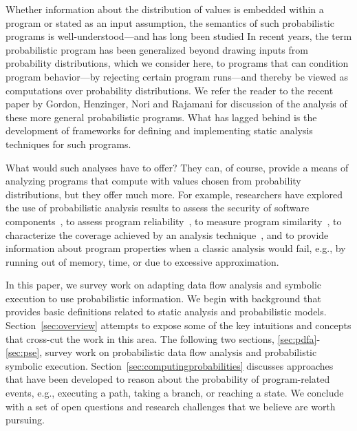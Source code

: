 
Whether information about the distribution of
values is embedded within a program or stated as an input assumption,
the semantics of such probabilistic programs is well-understood---and
has long been studied 
\cite{kozen1981semantics,kozen1983probabilistic,jones1990probabilistic,morgan1996probabilistic}
\setcounter{footnote}{0}
In recent
years, the term probabilistic program has been generalized beyond
drawing inputs from probability distributions, which we
consider here, to programs that can condition program behavior---by
rejecting certain program runs---and thereby be viewed as
computations over probability distributions.  We refer the reader to the
recent paper by Gordon, Henzinger, Nori and Rajamani \cite{Gordon2014}
for discussion of the analysis of these more general probabilistic programs. 
What has lagged behind is the development of frameworks for 
defining and implementing static analysis techniques for such programs.

What would such analyses have to offer?
They can, of course, provide a means of analyzing programs that compute
with values chosen from probability distributions, but they offer much
more.
For example, researchers have explored the use of probabilistic analysis
results to assess the security of software components~\cite{mardziel2013dynamic},
to assess program reliability~\cite{Filieri2013}, to measure program
similarity~\cite{Geldenhuys2012}, 
to characterize the coverage
achieved by an analysis technique~\cite{DwyerASE11}, and to provide information
about program properties when a classic analysis would fail, e.g.,
by running out of memory, time, or due to excessive approximation.

In this paper, we survey work on adapting data flow analysis 
and symbolic execution to use probabilistic information.
We begin with background that provides basic definitions
related to static analysis and probabilistic models.
Section~\ref{sec:overview} attempts to expose some of the key
intuitions and concepts that cross-cut the work in this area.
The following two sections, \ref{sec:pdfa}-\ref{sec:pse}, 
survey work on probabilistic data flow analysis and probabilistic
symbolic execution.  
Section~\ref{sec:computingprobabilities} discusses approaches that
have been developed to reason about the probability of program-related 
events, e.g., executing a path, taking a branch, or reaching a state.
We conclude with a set of open questions
and research challenges that we believe are worth pursuing.

